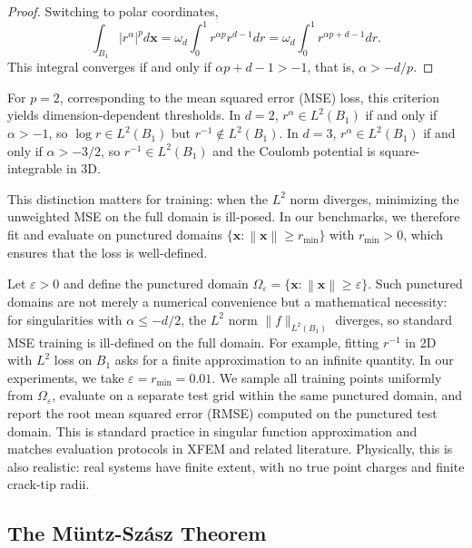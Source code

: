\documentclass[twoside,11pt]{article}
\newcommand{\bx}{\bm{x}}
\newcommand{\norm}[1]{\left\|#1\right\|}
\begin{document}
\begin{proof}
	Switching to polar coordinates,
	\[
		\int_{B_1} |r^\alpha|^p d\bx = \omega_d \int_0^1 r^{\alpha p} r^{d-1} dr = \omega_d \int_0^1 r^{\alpha p + d - 1} dr.
	\]
	This integral converges if and only if $\alpha p + d - 1 > -1$, that is, $\alpha > -d/p$.
\end{proof}

For $p = 2$, corresponding to the mean squared error (MSE) loss, this criterion yields dimension-dependent thresholds. In $d = 2$, $r^\alpha \in L^2(B_1)$ if and only if $\alpha > -1$, so $\log r \in L^2(B_1)$ but $r^{-1} \notin L^2(B_1)$. In $d = 3$, $r^\alpha \in L^2(B_1)$ if and only if $\alpha > -3/2$, so $r^{-1} \in L^2(B_1)$ and the Coulomb potential is square-integrable in 3D.

This distinction matters for training: when the $L^2$ norm diverges, minimizing the unweighted MSE on the full domain is ill-posed. In our benchmarks, we therefore fit and evaluate on punctured domains $\{\bx : \norm{\bx} \geq r_{\min}\}$ with $r_{\min} > 0$, which ensures that the loss is well-defined.

\begin{remark}
	\label{rem:punctured_domains}
	Let $\varepsilon > 0$ and define the punctured domain $\Omega_\varepsilon = \{\bx : \norm{\bx} \geq \varepsilon\}$. Such punctured domains are not merely a numerical convenience but a mathematical necessity: for singularities with $\alpha \leq -d/2$, the $L^2$ norm $\|f\|_{L^2(B_1)}$ diverges, so standard MSE training is ill-defined on the full domain. For example, fitting $r^{-1}$ in 2D with $L^2$ loss on $B_1$ asks for a finite approximation to an infinite quantity. In our experiments, we take $\varepsilon = r_{\min} = 0.01$. We sample all training points uniformly from $\Omega_\varepsilon$, evaluate on a separate test grid within the same punctured domain, and report the root mean squared error (RMSE) computed on the punctured test domain. This is standard practice in singular function approximation and matches evaluation protocols in XFEM \citep{moes1999finite} and related literature. Physically, this is also realistic: real systems have finite extent, with no true point charges and finite crack-tip radii.
\end{remark}

\subsection{The Müntz-Szász Theorem}
\label{subsec:muntz_szasz}
\end{document}
